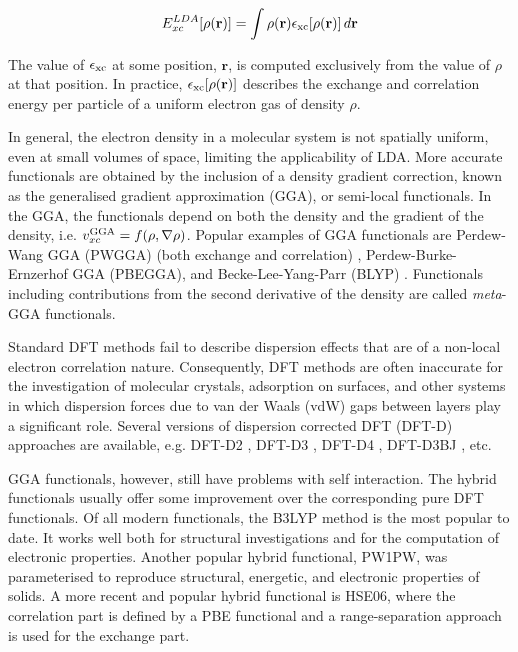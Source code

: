 \documentclass[../main.tex]{subfiles}
\begin{document}
\begin{equation}
    \label{eq:LDA}
    E_{xc}^{LDA}[\rho(\mathbf{r})] = \int\rho(\mathbf{r})\epsilon_{\rm xc}[\rho(\mathbf{r})]\,d\mathbf{r}
\end{equation}

The value of $\epsilon_{\rm xc}$ at some position, $\mathbf{r}$, is computed exclusively from the value of $\rho$ at that position. In practice, $\epsilon_{\rm xc}[\rho(\mathbf{r})]$ describes the exchange and correlation energy per particle of a uniform electron gas of density $\rho$.\cite{Dirac1930}

In general, the electron density in a molecular system is not spatially uniform, even at small volumes of space, limiting the applicability of LDA. More accurate functionals are obtained by the inclusion of a density gradient correction, known as the generalised gradient approximation (GGA), or semi-local functionals. In the GGA, the functionals depend on both the density and the gradient of the density, i.e. $v_{xc}^{\rm GGA} = f(\rho,\nabla\rho)$. Popular examples of GGA functionals are Perdew-Wang GGA (PWGGA) (both exchange and correlation) \cite{PerdewPRB92}, Perdew-Burke-Ernzerhof GGA (PBEGGA), \cite{PBE} and Becke-Lee-Yang-Parr (BLYP) \cite{adb19883098,cl1988785}. Functionals including contributions from the second derivative of the density are called {\it meta}-GGA functionals. \cite{Perdew-PRL-1999} 

Standard DFT methods fail to describe dispersion effects that are of a non-local electron correlation nature. Consequently, DFT methods are often inaccurate for the investigation of molecular crystals, adsorption on surfaces, and other systems in which dispersion forces due to van der Waals (vdW) gaps between layers play a significant role. Several versions of dispersion corrected DFT (DFT-D) approaches are available, e.g. DFT-D2 \cite{Grimme-1}, DFT-D3 \cite{Grimme-2}, DFT-D4 \cite{Grimme-3}, DFT-D3BJ \cite{Grimme-4,Beke-1}, etc. 

GGA functionals, however, still have problems with self interaction. The hybrid functionals usually offer some improvement over the corresponding pure DFT functionals. Of all modern functionals, the B3LYP method is the most popular to date.\cite{adb1993b,cl1988785} It works well both for structural investigations and for the computation of electronic properties. \cite{Cramer} Another popular hybrid functional, PW1PW, \cite{Bredow00,IslamPRB} was parameterised to reproduce structural, energetic, and electronic properties of solids. A more recent and popular hybrid functional is HSE06, where the correlation part is defined by a PBE functional and a range-separation approach is used for the exchange part. \cite{HSE06}  
\end{document}
